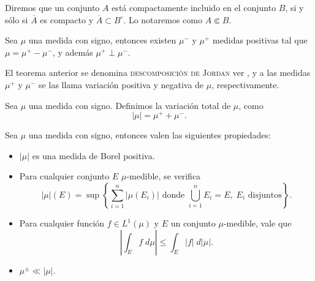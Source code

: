 \begin{defi}
	Diremos que un conjunto $A$ está compactamente incluido  en el conjunto $B$, si y sólo si $\overline{A}$ es compacto y $\overline{A}\subset B^\circ$. Lo notaremos como $A\Subset B$.
	\index[Simbolo]{$\Subset$}
 \end{defi}
\begin{thm}
    Sea $\mu$ una medida con signo, entonces existen $\mu^-$ y $\mu^+$ medidas positivas tal que $\mu=\mu^+-\mu^-$, y además $\mu^+\perp \mu^-$.\index[Simbolo]{$\mu^+$}\index[Simbolo]{$\mu^-$}
\end{thm}
El teorema anterior se denomina \textsc{descomposición de Jordan} ver \cite[Capitulo 3.1]{folland}, y a las medidas $\mu^+$ y $\mu^-$ se las llama variación positiva y negativa de $\mu$, respectivamente.

\begin{defi}
    Sea $\mu$ una medida con signo. Definimos la variación total de $\mu$, como 
    \begin{equation*}
        |\mu|=\mu^+ +\mu^-.
    \end{equation*}\index[Simbolo]{$\vert\mu\vert$}
\end{defi}


\begin{obs}
 Sea $\mu$ una medida con signo, entonces valen las siguientes propiedades: \label{obs:medida}
 \begin{itemize}
 \item $|\mu|$ es una medida de Borel positiva.
     \item Para cualquier conjunto $E$ $\mu$-medible,  se verifica
 \begin{equation}
     |\mu|(E)=\sup\left\{\sum_{i=1}^n|\mu(E_i)| \text{ donde }\bigcup_{i=1}^nE_i=E, \; E_i \text{ disjuntos}  \right\}.
 \end{equation}

 \item Para cualquier función $f\in L^1(\mu)$ y $E$ un conjunto $\mu$-medible, vale que
 $$\left|\int_Ef\;d\mu\right|\leq \int_E|f|\; d|\mu|.$$
 \item $ \mu^{\pm}\ll |\mu|$.
 \end{itemize}
\end{obs}

